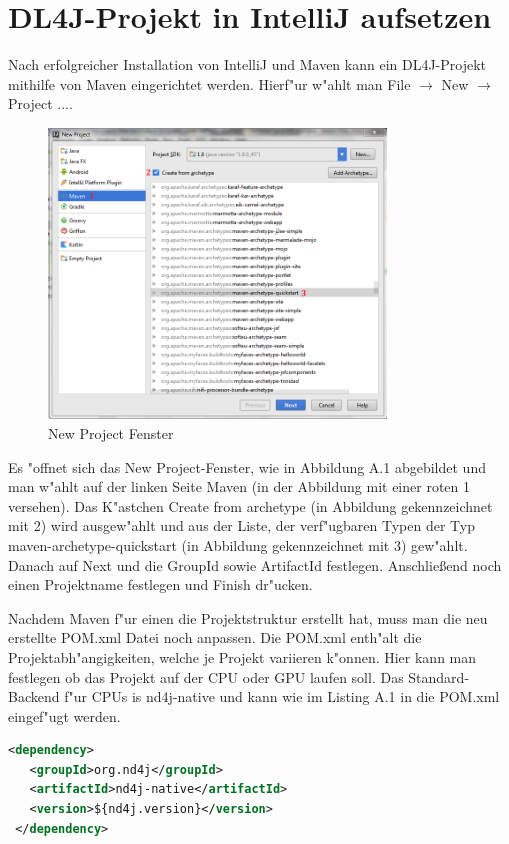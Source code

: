 \chapter{DL4J-Projekt in IntelliJ aufsetzen}
{
Nach erfolgreicher Installation von IntelliJ und Maven kann ein DL4J-Projekt mithilfe von Maven eingerichtet werden. Hierf"ur w"ahlt man \glqq File\grqq{} $\rightarrow$ \glqq New\grqq{} $\rightarrow$ \glqq Project ...\grqq . 
\renewcommand{\figurename}{Abb.}
\begin{figure}[htp]
\centering
\includegraphics[width=0.80\textwidth]{pictures/mavenProj.png}
\caption[\glqq New Project\grqq{} Fenster]{\glqq New Project\grqq{} Fenster}
\end{figure}
Es "offnet sich das \glqq New Project\grqq -Fenster, wie in Abbildung A.1 abgebildet und man w"ahlt auf der linken Seite \glqq Maven\grqq{} (in der Abbildung mit einer roten 1 versehen). Das K"astchen \glqq Create from archetype\grqq{} (in Abbildung gekennzeichnet mit 2) wird ausgew"ahlt und aus der Liste, der verf"ugbaren Typen der Typ \glqq maven-archetype-quickstart\grqq{} (in Abbildung gekennzeichnet mit 3) gew"ahlt. Danach auf \glqq Next\grqq{}  und die GroupId sowie ArtifactId festlegen. Anschlie{\ss}end noch einen Projektname festlegen und \glqq Finish\grqq{} dr"ucken.


Nachdem Maven f"ur einen die Projektstruktur erstellt hat, muss man die neu erstellte POM.xml Datei noch anpassen. Die POM.xml enth"alt die Projektabh"angigkeiten, welche je Projekt variieren k"onnen. Hier kann man festlegen ob das Projekt auf der CPU oder GPU laufen soll.
Das Standard-Backend f"ur CPUs is \glqq nd4j-native\grqq{} und kann wie im Listing A.1  in die POM.xml eingef"ugt werden.
\lstset{language=XML}
\begin{lstlisting}[language=XML,caption=Backend Dependency CPU]
 <dependency>
   <groupId>org.nd4j</groupId>
   <artifactId>nd4j-native</artifactId>
   <version>${nd4j.version}</version>
 </dependency>
\end{lstlisting}

}
